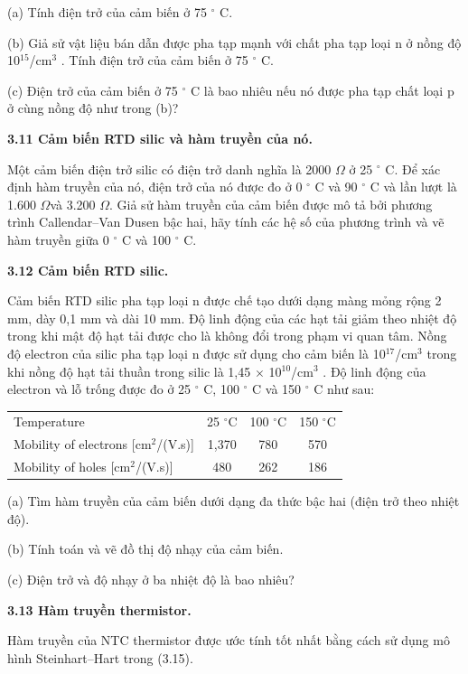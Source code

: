 \documentclass[12pt]{article}
\newcommand{\bt}[1]{\textbf{#1}}
\begin{document}
(a) Tính điện trở của cảm biến ở 75 $^\circ$ C.

(b) Giả sử vật liệu bán dẫn được pha tạp mạnh với chất pha tạp loại n ở nồng độ 10$^{15}$/cm$^3$ . Tính điện trở của cảm biến ở 75 $^\circ$ C.

(c) Điện trở của cảm biến ở 75 $^\circ$ C là bao nhiêu nếu nó được pha tạp chất loại p ở cùng nồng độ như trong (b)?

\bt{3.11 Cảm biến RTD silic và hàm truyền của nó.}

Một cảm biến điện trở silic có điện trở danh nghĩa là 2000 $\Omega$ ở 25 $^\circ$ C. Để xác định hàm truyền của nó, điện trở của nó được đo ở 0 $^\circ$ C và 90 $^\circ$ C và lần lượt là 1.600 $\Omega$và 3.200 $\Omega$. Giả sử hàm truyền của cảm biến được mô tả bởi phương trình Callendar–Van Dusen bậc hai, hãy tính các hệ số của phương trình và vẽ hàm truyền giữa 0 $^\circ$ C và 100 $^\circ$ C.

\bt{3.12 Cảm biến RTD silic.}

Cảm biến RTD silic pha tạp loại n được chế tạo dưới dạng màng mỏng rộng 2 mm, dày 0,1 mm và dài 10 mm. Độ linh động của các hạt tải giảm theo nhiệt độ trong khi mật độ hạt tải được cho là không đổi trong phạm vi quan tâm. Nồng độ electron của silic pha tạp loại n được sử dụng cho cảm biến là 10$^{17}$/cm$^3$ trong khi nồng độ hạt tải thuần trong silic là 1,45 $\times$ 10$^{10}$/cm$^3$ . Độ linh động của electron và lỗ trống được đo ở 25 $^\circ$ C, 100 $^\circ$ C và 150 $^\circ$ C như sau:

\begin{center}
\begin{tabular}{@{}lccc@{}}
\toprule
Temperature & 25 $^\circ$C & 100 $^\circ$C & 150 $^\circ$C\\
Mobility of electrons [cm$^2$/(V.s)] & 1,370 & 780 & 570\\
Mobility of holes [cm$^2$/(V.s)] & 480 & 262 & 186\\
\bottomrule
\end{tabular}
\end{center}

(a) Tìm hàm truyền của cảm biến dưới dạng đa thức bậc hai (điện trở theo nhiệt độ).

(b) Tính toán và vẽ đồ thị độ nhạy của cảm biến.

(c) Điện trở và độ nhạy ở ba nhiệt độ là bao nhiêu?

\bt{3.13 Hàm truyền thermistor.}

Hàm truyền của NTC thermistor được ước tính tốt nhất bằng cách sử dụng mô hình Steinhart–Hart trong (3.15).
\end{document}
